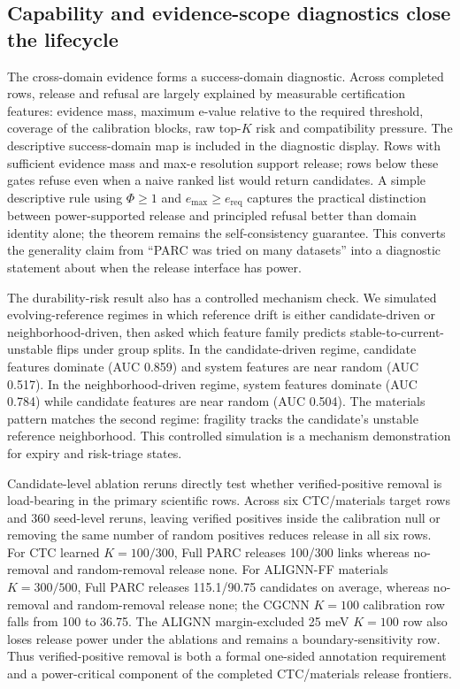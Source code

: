 \documentclass[10pt,twocolumn]{article}
\begin{document}
\subsection{Capability and evidence-scope diagnostics close the lifecycle}

The cross-domain evidence forms a success-domain diagnostic.
Across completed rows, release and refusal are largely explained by measurable certification features: evidence mass, maximum e-value relative to the required threshold, coverage of the calibration blocks, raw top-\(K\) risk and compatibility pressure.
The descriptive success-domain map is included in the diagnostic display.
Rows with sufficient evidence mass and max-e resolution support release; rows below these gates refuse even when a naive ranked list would return candidates.
A simple descriptive rule using \(\Phi\ge 1\) and \(e_{\max}\ge e_{\mathrm{req}}\) captures the practical distinction between power-supported release and principled refusal better than domain identity alone; the theorem remains the self-consistency guarantee.
This converts the generality claim from ``PARC was tried on many datasets'' into a diagnostic statement about when the release interface has power.

The durability-risk result also has a controlled mechanism check.
We simulated evolving-reference regimes in which reference drift is either candidate-driven or neighborhood-driven, then asked which feature family predicts stable-to-current-unstable flips under group splits.
In the candidate-driven regime, candidate features dominate (AUC 0.859) and system features are near random (AUC 0.517).
In the neighborhood-driven regime, system features dominate (AUC 0.784) while candidate features are near random (AUC 0.504).
The materials pattern matches the second regime: fragility tracks the candidate's unstable reference neighborhood.
This controlled simulation is a mechanism demonstration for expiry and risk-triage states.

Candidate-level ablation reruns directly test whether verified-positive removal is load-bearing in the primary scientific rows.
Across six CTC/materials target rows and 360 seed-level reruns, leaving verified positives inside the calibration null or removing the same number of random positives reduces release in all six rows.
For CTC learned \(K=100/300\), Full PARC releases 100/300 links whereas no-removal and random-removal release none.
For ALIGNN-FF materials \(K=300/500\), Full PARC releases 115.1/90.75 candidates on average, whereas no-removal and random-removal release none; the CGCNN \(K=100\) calibration row falls from 100 to 36.75.
The ALIGNN margin-excluded 25 meV \(K=100\) row also loses release power under the ablations and remains a boundary-sensitivity row.
Thus verified-positive removal is both a formal one-sided annotation requirement and a power-critical component of the completed CTC/materials release frontiers.
\end{document}
